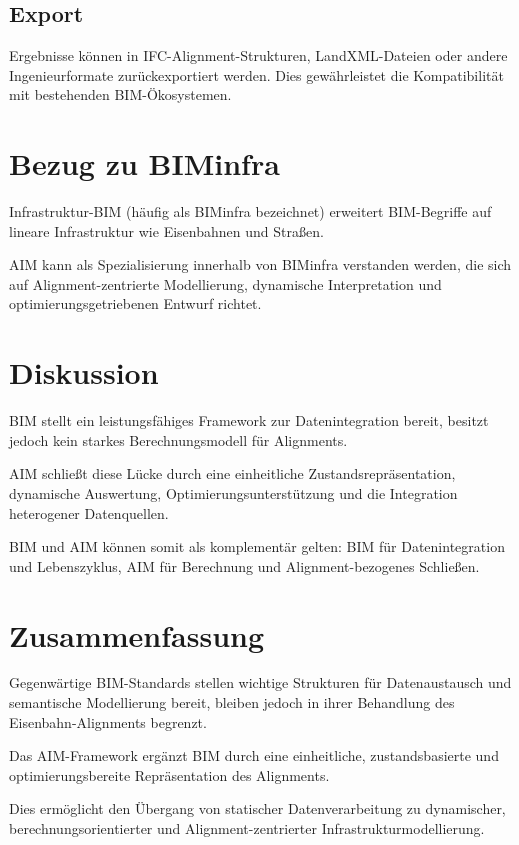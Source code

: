 \subsection{Export}

Ergebnisse können in IFC-Alignment-Strukturen, LandXML-Dateien oder andere
Ingenieurformate zurückexportiert werden. Dies gewährleistet die
Kompatibilität mit bestehenden BIM-Ökosystemen.

\section{Bezug zu BIMinfra}

Infrastruktur-BIM (häufig als BIMinfra bezeichnet) erweitert BIM-Begriffe
auf lineare Infrastruktur wie Eisenbahnen und Straßen.

AIM kann als Spezialisierung innerhalb von BIMinfra verstanden werden,
die sich auf Alignment-zentrierte Modellierung, dynamische Interpretation
und optimierungsgetriebenen Entwurf richtet.

\section{Diskussion}

BIM stellt ein leistungsfähiges Framework zur Datenintegration bereit,
besitzt jedoch kein starkes Berechnungsmodell für Alignments.

AIM schließt diese Lücke durch eine einheitliche Zustandsrepräsentation,
dynamische Auswertung, Optimierungsunterstützung und die Integration
heterogener Datenquellen.

BIM und AIM können somit als komplementär gelten: BIM für Datenintegration
und Lebenszyklus, AIM für Berechnung und Alignment-bezogenes Schließen.

\section{Zusammenfassung}
\begin{summary}
Gegenwärtige BIM-Standards stellen wichtige Strukturen für Datenaustausch
und semantische Modellierung bereit, bleiben jedoch in ihrer Behandlung
des Eisenbahn-Alignments begrenzt.

Das AIM-Framework ergänzt BIM durch eine einheitliche, zustandsbasierte
und optimierungsbereite Repräsentation des Alignments.

Dies ermöglicht den Übergang von statischer Datenverarbeitung zu
dynamischer, berechnungsorientierter und Alignment-zentrierter
Infrastrukturmodellierung.
\end{summary}
